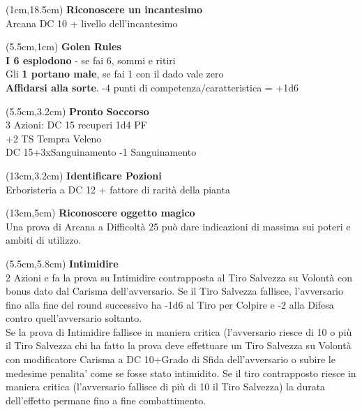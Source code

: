 \documentclass[a4paper,12 pt,openany]{book}
\begin{document}
	\begin{textblock*}{4cm}(1cm,18.5cm) %
\textbf{Riconoscere un incantesimo}\\ Arcana DC 10 + livello dell'incantesimo

	\end{textblock*}

	\begin{textblock*}{14.5cm}(5.5cm,1cm) %
	\textbf{Golen Rules}\\

	{\textbf{I 6 esplodono}} - se fai 6, sommi e ritiri\\
	Gli \textbf{1 portano male}, se fai 1 con il dado vale zero\\
	\textbf{Affidarsi alla sorte}. -4 punti di competenza/caratteristica = +1d6\\
\end{textblock*}

	\begin{textblock*}{7cm}(5.5cm,3.2cm) %
	\textbf{Pronto Soccorso}\\
3 Azioni: DC 15 recuperi 1d4 PF\\
+2 TS Tempra Veleno\\
DC 15+3xSanguinamento -1 Sanguinamento
\end{textblock*}

\begin{textblock*}{7cm}(13cm,3.2cm) %
\textbf{Identificare  Pozioni}\\
Erboristeria a DC 12 + fattore di rarità della pianta
\end{textblock*}

\begin{textblock*}{7cm}(13cm,5cm) %
\textbf{Riconoscere oggetto magico}\\
Una prova di Arcana a Difficoltà 25 può dare indicazioni di massima sui poteri e ambiti di utilizzo.
\end{textblock*}

{\small
	\begin{textblock*}{7cm}(5.5cm,5.8cm) %
\textbf{Intimidire}\\
2 Azioni e fa la prova su
Intimidire contrapposta al Tiro Salvezza su
Volontà con bonus dato dal Carisma
dell’avversario. Se il Tiro Salvezza fallisce,
l’avversario fino alla fine del round successivo ha
-1d6 al Tiro per Colpire e -2 alla Difesa contro
quell’avversario soltanto.\\
Se la prova di Intimidire fallisce in maniera
critica (l’avversario riesce di 10 o più il Tiro
Salvezza chi ha fatto la prova deve effettuare un
Tiro Salvezza su Volontà con modificatore
Carisma a DC 10+Grado di Sfida dell’avversario
o subire le medesime penalita’ come se fosse
stato intimidito. Se il tiro contrapposto riesce in
maniera critica (l’avversario fallisce di più di 10 il
Tiro Salvezza) la durata dell’effetto permane fino
a fine combattimento.
\end{textblock*}}
\end{document}

